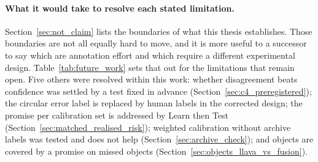 \documentclass[12pt,a4paper]{report}
\begin{document}
\paragraph{What it would take to resolve each stated limitation.} Section~\ref{sec:not_claim} lists the boundaries of what this thesis establishes. Those boundaries are not all equally hard to move, and it is more useful to a successor to say which are annotation effort and which require a different experimental design. Table~\ref{tab:future_work} sets that out for the limitations that remain open. Five others were resolved within this work: whether disagreement beats confidence was settled by a test fixed in advance (Section~\ref{sec:c4_preregistered}); the circular error label is replaced by human labels in the corrected design; the promise per calibration set is addressed by Learn then Test (Section~\ref{sec:matched_realised_risk}); weighted calibration without archive labels was tested and does not help (Section~\ref{sec:archive_check}); and objects are covered by a promise on missed objects (Section~\ref{sec:objects_llava_vs_fusion}).
\end{document}
